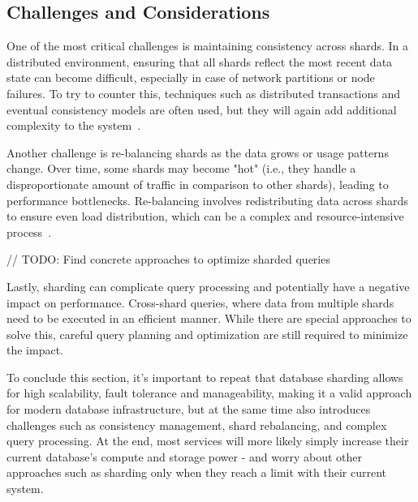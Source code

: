 \subsection{Challenges and Considerations}
One of the most critical challenges is maintaining consistency across shards. In a distributed environment, ensuring that all shards reflect the most recent data state can become difficult, especially in case of network partitions or node failures. To try to counter this, techniques such as distributed transactions and eventual consistency models are often used, but they will again add additional complexity to the system~\parencite{skyline_joins}.

Another challenge is re-balancing shards as the data grows or usage patterns change. Over time, some shards may become "hot" (i.e., they handle a disproportionate amount of traffic in comparison to other shards), leading to performance bottlenecks. Re-balancing involves redistributing data across shards to ensure even load distribution, which can be a complex and resource-intensive process~\parencite{db_sharding_cloud}.

// TODO: Find concrete approaches to optimize sharded queries

{Lastly, sharding can complicate query processing and potentially have a negative impact on performance. Cross-shard queries, where data from multiple shards need to be executed in an efficient manner. While there are special approaches to solve this, careful query planning and optimization are still required to minimize the impact.}

To conclude this section, it's important to repeat that database sharding allows for high scalability, fault tolerance and manageability, making it a valid approach for modern database infrastructure, but at the same time also introduces challenges such as consistency management, shard rebalancing, and complex query processing. At the end, most services will more likely simply increase their current database's compute and storage power - and worry about other approaches such as sharding only when they reach a limit with their current system.  
